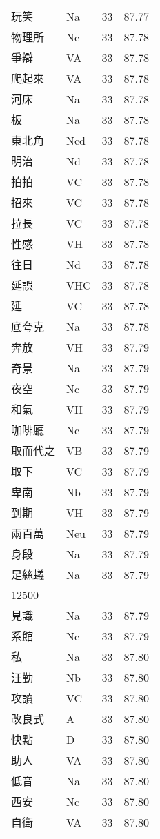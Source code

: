 \documentclass[twocolumn]{book}
\begin{document}
\begin{supertabular}{llrr}
玩笑 & Na & 33 &  87.77\\
物理所 & Nc & 33 &  87.78\\
爭辯 & VA & 33 &  87.78\\
爬起來 & VA & 33 &  87.78\\
河床 & Na & 33 &  87.78\\
板 & Na & 33 &  87.78\\
東北角 & Ncd & 33 &  87.78\\
明治 & Nd & 33 &  87.78\\
拍拍 & VC & 33 &  87.78\\
招來 & VC & 33 &  87.78\\
拉長 & VC & 33 &  87.78\\
性感 & VH & 33 &  87.78\\
往日 & Nd & 33 &  87.78\\
延誤 & VHC & 33 &  87.78\\
延 & VC & 33 &  87.78\\
底夸克 & Na & 33 &  87.78\\
奔放 & VH & 33 &  87.79\\
奇景 & Na & 33 &  87.79\\
夜空 & Nc & 33 &  87.79\\
和氣 & VH & 33 &  87.79\\
咖啡廳 & Nc & 33 &  87.79\\
取而代之 & VB & 33 &  87.79\\
取下 & VC & 33 &  87.79\\
卑南 & Nb & 33 &  87.79\\
到期 & VH & 33 &  87.79\\
兩百萬 & Neu & 33 &  87.79\\
身段 & Na & 33 &  87.79\\
足絲蟻 & Na & 33 &  87.79\\
12500\\
見識 & Na & 33 &  87.79\\
系館 & Nc & 33 &  87.79\\
私 & Na & 33 &  87.80\\
汪勤 & Nb & 33 &  87.80\\
攻讀 & VC & 33 &  87.80\\
改良式 & A & 33 &  87.80\\
快點 & D & 33 &  87.80\\
助人 & VA & 33 &  87.80\\
低音 & Na & 33 &  87.80\\
西安 & Nc & 33 &  87.80\\
自衛 & VA & 33 &  87.80\\

\end{supertabular}
\end{document}
